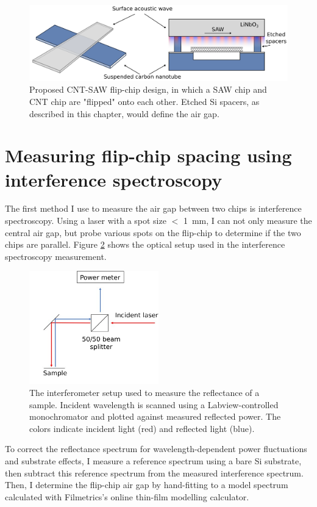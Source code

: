 \documentclass[double,12pt,1in,seploa]{beavtex}
\let\Oldsection\section
\renewcommand{\section}{\FloatBarrier\Oldsection}
\begin{document}
\begin{figure}
    \includegraphics[width=1\textwidth]{Flip-chip intro figure.png}
    \caption{Proposed CNT-SAW flip-chip design, in which a SAW chip and CNT chip are "flipped" onto each other. Etched Si spacers, as described in this chapter, would define the air gap.}
    \label{flip-chip intro figure}
\end{figure}

\section{Measuring flip-chip spacing using interference spectroscopy}

The first method I use to measure the air gap between two chips is interference spectroscopy. Using a laser with a spot size $<$ \SI{1}{\milli\meter}, I can not only measure the central air gap, but probe various spots on the flip-chip to determine if the two chips are parallel. Figure \ref{InterfSpec} shows the optical setup used in the interference spectroscopy measurement.


\begin{figure}
    \includegraphics[width = 0.5\textwidth]{Interference spectroscopy.pdf}
    \caption{The interferometer setup used to measure the reflectance of a sample. Incident wavelength is scanned using a Labview-controlled monochromator and plotted against measured reflected power. The colors indicate incident light (red) and reflected light (blue).}
    \label{InterfSpec}
\end{figure}
To correct the reflectance spectrum for wavelength-dependent power fluctuations and substrate effects, I measure a reference spectrum using a bare Si substrate, then subtract this reference spectrum from the measured interference spectrum. Then, I determine the flip-chip air gap by hand-fitting to a model spectrum calculated with Filmetrics’s online thin-film modelling calculator. 
\end{document}
